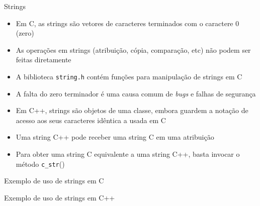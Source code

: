 \begin{frame}[fragile]{Strings}

	\begin{itemize}
		\item Em C, as strings são vetores de caracteres terminados com o caractere 0 (zero)

        \item As operações em strings (atribuição, cópia, comparação, etc) não podem ser
        feitas diretamente

        \item A biblioteca \texttt{string.h} contém funções para manipulação de strings em C

        \item A falta do zero terminador é uma causa comum de \textit{bugs} e falhas de 
        segurança
 
		\item Em C++, strings são objetos de uma classe, embora guardem a notação de acesso aos 
        seus caracteres idêntica a usada em C

		\item Uma string C++ pode receber uma string C em uma atribuição

        \item Para obter uma string C 
		equivalente a uma string C++, basta invocar o método \texttt{c\_str}()
	\end{itemize}

\end{frame} 

\begin{frame}[fragile]{Exemplo de uso de strings em C}
\end{frame}

\begin{frame}[fragile]{Exemplo de uso de strings em C++}
\end{frame}
